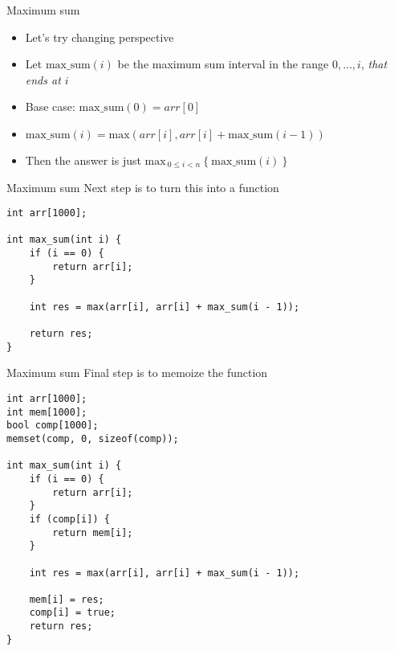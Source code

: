    \begin{frame}[fragile]{Maximum sum}

    \begin{itemize}
        \item Let's try changing perspective

    \item Let $\mathrm{max\_{}sum}(i)$ be the maximum sum interval in the range $0,\ldots,i$, \textit{that ends at $i$}

        \item Base case: $\mathrm{max\_{}sum}(0) = arr[0]$

    \item $\mathrm{max\_{}sum}(i) = \mathrm{max}(arr[i], arr[i] + \mathrm{max\_{}sum}(i - 1))$

        \item Then the answer is just $\mathrm{max}_{\ 0 \leq i < n}\ \{\ \mathrm{max\_{}sum}(i)\ \}$
    \end{itemize}

\end{frame}

   \begin{frame}[fragile]{Maximum sum}
 Next step is to turn this into a function

    \begin{lstlisting}
int arr[1000];

int max_sum(int i) {
    if (i == 0) {
        return arr[i];
    }

    int res = max(arr[i], arr[i] + max_sum(i - 1));

    return res;
}
    \end{lstlisting}
\end{frame}

   \begin{frame}[fragile]{Maximum sum}
Final step is to memoize the function

    \begin{lstlisting}
int arr[1000];
int mem[1000];
bool comp[1000];
memset(comp, 0, sizeof(comp));

int max_sum(int i) {
    if (i == 0) {
        return arr[i];
    }
    if (comp[i]) {
        return mem[i];
    }

    int res = max(arr[i], arr[i] + max_sum(i - 1));

    mem[i] = res;
    comp[i] = true;
    return res;
}
    \end{lstlisting}
\end{frame}

